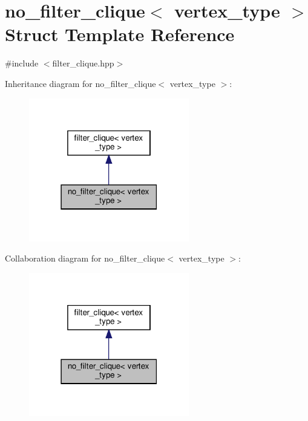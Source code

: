 \hypertarget{structno__filter__clique}{}\section{no\+\_\+filter\+\_\+clique$<$ vertex\+\_\+type $>$ Struct Template Reference}
\label{structno__filter__clique}


{\ttfamily \#include $<$filter\+\_\+clique.\+hpp$>$}



Inheritance diagram for no\+\_\+filter\+\_\+clique$<$ vertex\+\_\+type $>$\+:
\nopagebreak
\begin{figure}[H]
\begin{center}
\leavevmode
\includegraphics[width=198pt]{df/d53/structno__filter__clique__inherit__graph}
\end{center}
\end{figure}


Collaboration diagram for no\+\_\+filter\+\_\+clique$<$ vertex\+\_\+type $>$\+:
\nopagebreak
\begin{figure}[H]
\begin{center}
\leavevmode
\includegraphics[width=198pt]{d8/d3b/structno__filter__clique__coll__graph}
\end{center}
\end{figure}

